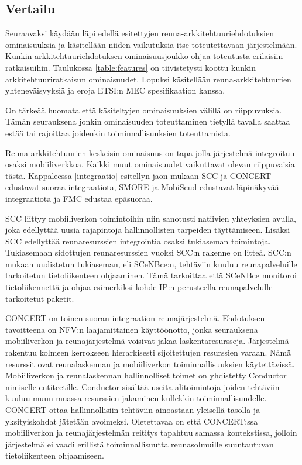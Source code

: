 \subsection{Vertailu}
Seuraavaksi käydään läpi edellä esitettyjen reuna-arkkitehtuuriehdotuksien ominaisuuksia ja käsitellään niiden vaikutuksia itse toteutettavaan järjestelmään.
Kunkin arkkitehtuuriehdotuksen ominaisuusjoukko ohjaa toteutusta erilaisiin ratkaisuihin. Taulukossa \ref{table:features} on tiivistetysti koottu kunkin arkkitehtuuriratkaisun ominaisuudet.
Lopuksi käsitellään reuna-arkkitehtuurien yhteneväisyyksiä ja eroja ETSI:n MEC spesifikaation kanssa.

On tärkeää huomata että käsiteltyjen ominaisuuksien välillä on riippuvuksia. Tämän seurauksena jonkin ominaisuuden toteuttaminen tietyllä tavalla saattaa estää tai rajoittaa joidenkin toiminnallisuuksien toteuttamista. 


Reuna-arkkitehtuurien keskeisin ominaisuus on tapa jolla järjestelmä integroituu osaksi mobiiliverkkoa. Kaikki muut ominaisuudet vaikuttavat olevan riippuvaisia tästä.
Kappaleessa \ref{integraatio} esitellyn jaon mukaan SCC ja CONCERT edustavat suoraa integraatiota, SMORE ja MobiScud edustavat läpinäkyvää integraatiota ja FMC edustaa epäsuoraa.

SCC liittyy mobiiliverkon toimintoihin niin sanotusti natiivien yhteyksien avulla, joka edellyttää uusia rajapintoja hallinnollisten tarpeiden täyttämiseen. Lisäksi SCC edellyttää reunaresurssien integrointia osaksi tukiaseman toimintoja. 
Tukiasemaan sidottujen reunaresurssien vuoksi SCC:n rakenne on litteä. 
SCC:n mukaan uudistetun tukiaseman, eli SCeNBce:n, tehtäviin kuuluu reunapalveluille tarkoitetun tietoliikenteen ohjaaminen. Tämä tarkoittaa että SCeNBce monitoroi tietoliikennettä ja ohjaa esimerkiksi kohde IP:n perusteella reunapalvelulle tarkoitetut paketit.

CONCERT on toinen suoran integraation reunajärjestelmä. Ehdotuksen tavoitteena on NFV:n laajamittainen käyttöönotto, jonka seurauksena mobiiliverkon ja reunajärjestelmä voisivat jakaa laskentaresursseja. Järjestelmä rakentuu kolmeen kerrokseen hierarkisesti sijoitettujen resurssien varaan. Nämä resurssit ovat reunalaskennan ja mobiiliverkon toiminnallisuuksien käytettävissä. 
Mobiiliverkon ja reunalaskennan hallinnolliset toimet on yhdistetty Conductor nimiselle entiteetille. Conductor sisältää useita alitoimintoja joiden tehtäviin kuuluu muun muassa resurssien jakaminen kullekkin toiminnallisuudelle. CONCERT ottaa hallinnollisiin tehtäviin ainoastaan yleisellä tasolla ja yksityiskohdat jätetään avoimeksi. Oletettavaa on että CONCERT:ssa mobiiliverkon ja reunajärjestelmän reititys tapahtuu samassa kontekstissa, jolloin järjestelmä ei vaadi erillistä toiminnallisuutta reunasolmuille suuntautuvan tietoliikenteen ohjaamiseen. 

